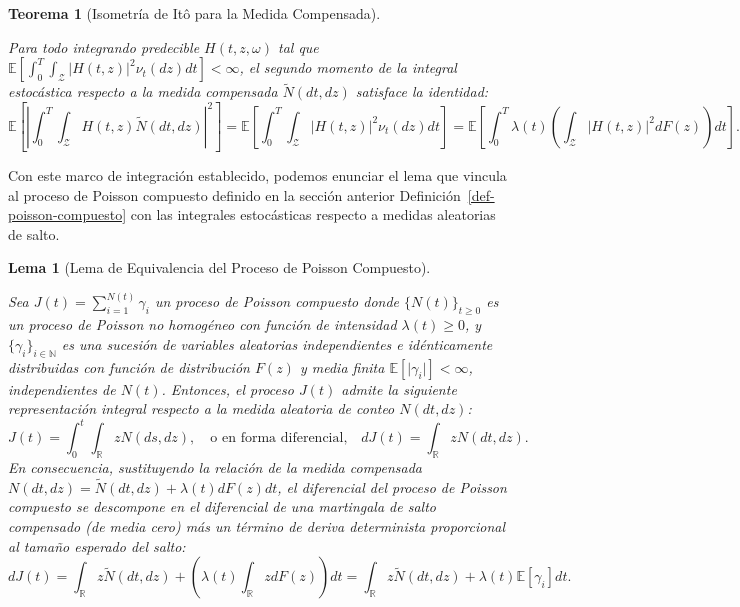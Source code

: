 \documentclass[
  spanish,
  letterpaper,
  DIV=11,
  numbers=noendperiod]{scrreprt}
\theoremstyle{plain}
\newtheorem{lemma}{Lema}[chapter]
\theoremstyle{plain}
\newtheorem{theorem}{Teorema}[chapter]
\theoremstyle{plain}
\theoremstyle{definition}
\theoremstyle{remark}
\begin{document}
\begin{theorem}[Isometría de Itô para la Medida
Compensada]\protect\hypertarget{thm-isometria-saltos}{}\label{thm-isometria-saltos}

Para todo integrando predecible \(H(t, z, \omega)\) tal que
\(\mathbb{E} \left[ \int_0^T \int_{\mathcal{Z}} \vert H(t, z) \vert^2 \nu_t(dz) dt \right] < \infty\),
el segundo momento de la integral estocástica respecto a la medida
compensada \(\tilde{N}(dt, dz)\) satisface la identidad: \[
\mathbb{E}\left[ \left\vert \int_0^T \int_{\mathcal{Z}} H(t, z) \tilde{N}(dt, dz) \right\vert^2 \right] = \mathbb{E}\left[ \int_0^T \int_{\mathcal{Z}} \vert H(t, z) \vert^2 \nu_t(dz) dt \right] = \mathbb{E}\left[ \int_0^T \lambda(t) \left( \int_{\mathcal{Z}} \vert H(t, z) \vert^2 dF(z) \right) dt \right].
\]

\end{theorem}

Con este marco de integración establecido, podemos enunciar el lema que
vincula al proceso de Poisson compuesto definido en la sección anterior
Definición~\ref{def-poisson-compuesto} con las integrales estocásticas
respecto a medidas aleatorias de salto.

\begin{lemma}[Lema de Equivalencia del Proceso de Poisson
Compuesto]\protect\hypertarget{lem-equivalencia-saltos}{}\label{lem-equivalencia-saltos}

Sea \(\displaystyle J(t) = \sum_{i=1}^{N(t)} \gamma_i\) un proceso de
Poisson compuesto donde \(\displaystyle \{N(t)\}_{t \ge 0}\) es un
proceso de Poisson no homogéneo con función de intensidad
\(\lambda(t) \ge 0\), y \(\{\gamma_i\}_{i \in \mathbb{N}}\) es una
sucesión de variables aleatorias independientes e idénticamente
distribuidas con función de distribución \(F(z)\) y media finita
\(\mathbb{E}[\vert \gamma_i \vert] < \infty\), independientes de
\(N(t)\). Entonces, el proceso \(J(t)\) admite la siguiente
representación integral respecto a la medida aleatoria de conteo
\(N(dt, dz)\): \[
J(t) = \int_0^t \int_{\mathbb{R}} z N(ds, dz), \quad \text{o en forma diferencial,} \quad dJ(t) = \int_{\mathbb{R}} z N(dt, dz).
\] En consecuencia, sustituyendo la relación de la medida compensada
\(N(dt, dz) = \tilde{N}(dt, dz) + \lambda(t)dF(z)dt\), el diferencial
del proceso de Poisson compuesto se descompone en el diferencial de una
martingala de salto compensado (de media cero) más un término de deriva
determinista proporcional al tamaño esperado del salto: \[
dJ(t) = \int_{\mathbb{R}} z \tilde{N}(dt, dz) + \left( \lambda(t) \int_{\mathbb{R}} z dF(z) \right) dt = \int_{\mathbb{R}} z \tilde{N}(dt, dz) + \lambda(t) \mathbb{E}[\gamma_i] dt.
\]

\end{lemma}
\end{document}
